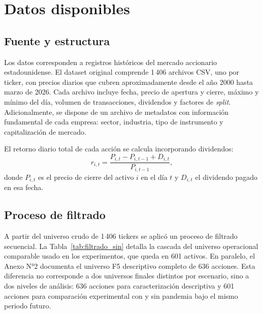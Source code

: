 \section{Datos disponibles}

\subsection{Fuente y estructura}

Los datos corresponden a registros hist\'oricos del mercado accionario
estadounidense. El dataset original comprende 1\,406 archivos CSV, uno por ticker, con precios diarios que cubren aproximadamente desde el a\~no 2000
hasta marzo de 2026. Cada archivo incluye fecha, precio de apertura y cierre,
m\'aximo y m\'inimo del d\'ia, volumen de transacciones, dividendos y factores
de \textit{split}. Adicionalmente, se dispone de un archivo de metadatos con
informaci\'on fundamental de cada empresa: sector, industria, tipo de
instrumento y capitalizaci\'on de mercado.

El retorno diario total de cada acci\'on se calcula incorporando dividendos:
\begin{equation}
r_{i,t}=\frac{P_{i,t}-P_{i,t-1}+D_{i,t}}{P_{i,t-1}},
\end{equation}
donde $P_{i,t}$ es el precio de cierre del activo $i$ en el d\'ia $t$ y
$D_{i,t}$ el dividendo pagado en esa fecha.

\subsection{Proceso de filtrado}

A partir del universo crudo de 1\,406 tickers se aplic\'o un proceso de
filtrado secuencial. La Tabla~\ref{tab:filtrado_sin} detalla la cascada del
universo operacional comparable usado en los experimentos, que queda en
601 activos. En paralelo, el Anexo N°2 documenta el universo F5
descriptivo completo de 636 acciones. Esta diferencia no corresponde a dos
universos finales distintos por escenario, sino a dos niveles de an\'alisis:
636 acciones para caracterizaci\'on descriptiva y 601 acciones para
comparaci\'on experimental con y sin pandemia bajo el mismo periodo futuro.

